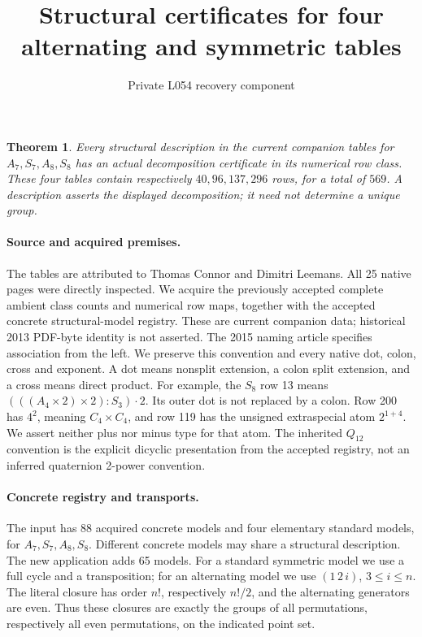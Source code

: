 \documentclass[11pt]{article}
\title{Structural certificates for four alternating and symmetric tables}
\author{Private L054 recovery component}\date{}
\newtheorem{theorem}{Theorem}\newtheorem{lemma}{Lemma}
\begin{document}
\maketitle
\begin{theorem}
Every structural description in the current companion tables for
$A_7,S_7,A_8,S_8$ has an actual decomposition certificate in its numerical
row class. These four tables contain respectively $40,96,137,296$ rows,
for a total of $569$. A description asserts the displayed decomposition;
it need not determine a unique group.
\end{theorem}

\paragraph{Source and acquired premises.}
The tables are attributed to Thomas Connor and Dimitri Leemans.
All 25 native pages were directly inspected. We acquire the previously
accepted complete ambient class counts and numerical row maps, together
with the accepted concrete structural-model registry. These are current
companion data; historical 2013 PDF-byte identity is not asserted.
The 2015 naming article specifies association from the left. We preserve
this convention and every native dot, colon, cross and exponent.
A dot means nonsplit extension, a colon split extension, and a cross
means direct product. For example, the $S_8$ row 13 means
$(((A_4\times2)\times2):S_3)\mathbin{\cdot}2$.
Its outer dot is not replaced by a colon. Row 200 has $4^2$, meaning
$C_4\times C_4$, and row 119 has the unsigned extraspecial atom
$2^{1+4}$. We assert neither plus nor minus type for that atom.
The inherited $Q_{12}$ convention is the explicit dicyclic presentation
from the accepted registry, not an inferred quaternion 2-power convention.

\paragraph{Concrete registry and transports.}
The input has 88 acquired concrete models and four elementary standard
models, for $A_7,S_7,A_8,S_8$. Different concrete models may share a
structural description. The new application adds 65 models. For a
standard symmetric model we use a full cycle and a transposition; for an
alternating model we use $(1\,2\,i)$, $3\leq i\leq n$. The literal closure
has order $n!$, respectively $n!/2$, and the alternating generators are
even. Thus these closures are exactly the groups of all permutations,
respectively all even permutations, on the indicated point set.
\end{document}
